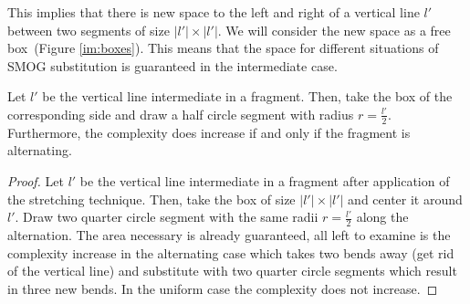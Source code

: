 This implies that there is new space to the left and right of a vertical line $l'$ between two segments of size $|l'|\times|l'|$. We will consider the new space as a free \grqq box\grqq~(Figure \ref{im:boxes}). This means that the space for different situations of SMOG substitution is guaranteed in the intermediate case.
\begin{lemma}
Let $l'$ be the vertical line intermediate in a fragment. Then, take the box of the corresponding side and draw a half circle segment with radius $r = \frac{l'}{2}$. Furthermore, the complexity does increase if and only if the fragment is alternating.
\end{lemma}
\begin{proof}
	Let $l'$ be the vertical line intermediate in a fragment after application of the stretching technique. Then, take the box of size $|l'| \times |l'|$ and center it around $l'$. Draw two quarter circle segment with the same radii $r = \frac{l'}{2}$ along the alternation. The area necessary is already guaranteed, all left to examine is the complexity increase in the alternating case which takes two bends away (get rid of the vertical line) and substitute with two quarter circle segments which result in three new bends. In the uniform case the complexity does not increase.
\end{proof}
